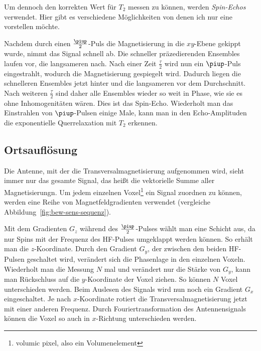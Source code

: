 \documentclass[
    11pt,
    ngerman
]{scrreprt}
\begin{document}
Um dennoch den korrekten Wert für $T_2$ messen zu können, werden
\emph{Spin-Echos} verwendet. Hier gibt es verschiedene Möglichkeiten von denen
ich nur eine vorstellen möchte.

Nachdem durch einen $\frac\piup2$-Puls die Magnetisierung in die $xy$-Ebene
gekippt wurde, nimmt das Signal schnell ab. Die schneller präzedierenden
Ensembles laufen vor, die langsameren nach. Nach einer Zeit $\frac\tau2$ wird
nun ein $\piup$-Puls eingestrahlt, wodurch die Magnetisierung gespiegelt wird.
Dadurch liegen die schnelleren Ensembles jetzt hinter und die langsameren vor
dem Durchschnitt. Nach weiteren $\frac\tau2$ sind daher alle Ensembles wieder
so weit in Phase, wie sie es ohne Inhomogenitäten wären. Dies ist das
Spin-Echo. Wiederholt man das Einstrahlen von $\piup$-Pulsen einige Male, kann
man in den Echo-Amplituden die exponentielle Querrelaxation mit $T_2$ erkennen.

\subsection{Ortsauflösung}

Die Antenne, mit der die Transversalmagnetisierung aufgenommen wird, sieht
immer nur das gesamte Signal, das heißt die vektorielle Summe aller
Magnetisierungn. Um jedem einzelnen Voxel\footnote{volumic pixel, also ein
Volumenelement} ein Signal zuordnen zu können, werden eine Reihe von
Magnetfeldgradienten verwendet (vergleiche
Abbildung~\ref{fig:bew-sens-sequenz}).

Mit dem Gradienten $G_z$ während des $\frac\piup2$-Pulses wählt man eine
Schicht aus, da nur Spins mit der Frequenz des HF-Pulses umgeklappt werden
können. So erhält man die $z$-Koordinate. Durch den Gradient $G_y$,
der zwischen den beiden HF-Pulsen geschaltet wird, verändert sich die
Phasenlage in den einzelnen Voxeln. Wiederholt man die Messung $N$ mal und
verändert nur die Stärke von $G_y$, kann man Rückschluss auf die $y$-Koordinate
der Voxel ziehen. So können $N$ Voxel unterschieden werden. Beim Auslesen des
Signals wird nun noch ein Gradient $G_x$ eingeschaltet. Je nach $x$-Koordinate
rotiert die Transversalmagnetisierung jetzt mit einer anderen Frequenz. Durch
Fouriertransformation des Antennensignals können die Voxel so auch in
$x$-Richtung unterschieden werden.
\end{document}
